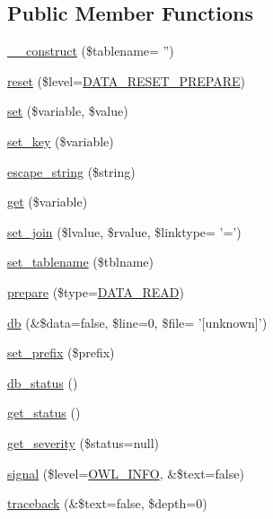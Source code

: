 \subsection*{Public Member Functions}
\begin{DoxyCompactItemize}
\item 
\hyperlink{classDataHandler_a4fd274c45bf06283b05e757b7c081439}{\_\-\_\-construct} (\$tablename= '')
\item 
\hyperlink{classDataHandler_ab89e1aaad9cd0a37f1c7f13c1d9c0d57}{reset} (\$level=\hyperlink{class_8datahandler_8php_a19a99423705b41e563424ae76d7fe184}{DATA\_\-RESET\_\-PREPARE})
\item 
\hyperlink{classDataHandler_a296f26f5af1e46a49ae44110848fa031}{set} (\$variable, \$value)
\item 
\hyperlink{classDataHandler_a32ce223478b78a4ea9838a3c6ac7440c}{set\_\-key} (\$variable)
\item 
\hyperlink{classDataHandler_a435338a167a44a041af2895859abb0c9}{escape\_\-string} (\$string)
\item 
\hyperlink{classDataHandler_a7dcf85dac419f51ad4daa166c928a399}{get} (\$variable)
\item 
\hyperlink{classDataHandler_a9b77733f02e9d6281fc40df110c0ba70}{set\_\-join} (\$lvalue, \$rvalue, \$linktype= '=')
\item 
\hyperlink{classDataHandler_abcb68472abd7da8ee6296421f0a7f2e9}{set\_\-tablename} (\$tblname)
\item 
\hyperlink{classDataHandler_af3e7a17194e97300d499e9178f4913cb}{prepare} (\$type=\hyperlink{class_8datahandler_8php_ac28f74b49007773d24ca2207baac6d32}{DATA\_\-READ})
\item 
\hyperlink{classDataHandler_abb329fe5a97eb8df928aabfc8078ff23}{db} (\&\$data=false, \$line=0, \$file= '\mbox{[}unknown\mbox{]}')
\item 
\hyperlink{classDataHandler_a27db6fb8365b7def4db7bd72984a0089}{set\_\-prefix} (\$prefix)
\item 
\hyperlink{classDataHandler_a3c82ec0a40dabcc55dc203c96abf02d2}{db\_\-status} ()
\item 
\hyperlink{class__OWL_a99ec771fa2c5c279f80152cc09e489a8}{get\_\-status} ()
\item 
\hyperlink{class__OWL_adf9509ef96858be7bdd9414c5ef129aa}{get\_\-severity} (\$status=null)
\item 
\hyperlink{class__OWL_a51ba4a16409acf2a2f61f286939091a5}{signal} (\$level=\hyperlink{owl_8severitycodes_8php_a139328861128689f2f4def6a399d9057}{OWL\_\-INFO}, \&\$text=false)
\item 
\hyperlink{class__OWL_aa29547995d6741b7d2b90c1d4ea99a13}{traceback} (\&\$text=false, \$depth=0)
\end{DoxyCompactItemize}
